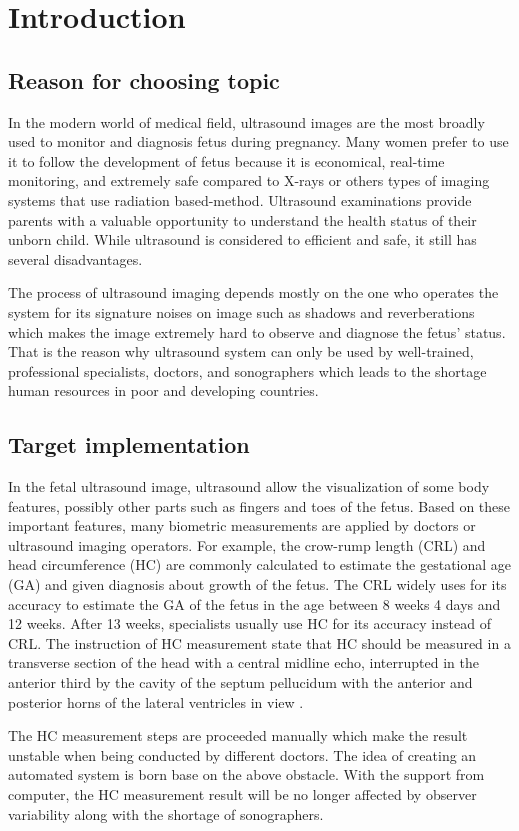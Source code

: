 \chapter{Introduction}
\section{Reason for choosing topic}
\label{section:reason_topic}
\noindent
	
	In the modern world of medical field, ultrasound images are the most broadly used to monitor and diagnosis fetus during pregnancy. Many women prefer to use it to follow the development of fetus because it is economical, real-time monitoring, and extremely safe compared to X-rays or others types of imaging systems that use radiation based-method. Ultrasound examinations provide parents with a valuable opportunity to understand the health status of their unborn child. While ultrasound is considered to efficient and safe, it still has several disadvantages. 
	
	The process of ultrasound imaging depends mostly on the one who operates the system for its signature noises on image such as shadows and reverberations which makes the image extremely hard to observe and diagnose the fetus’ status. That is the reason why ultrasound system can only be used by well-trained, professional specialists, doctors, and sonographers which leads to the shortage human resources in poor and developing countries.
	
\section{Target implementation}
\label{section:target_implementation}
\noindent
	
	In the fetal ultrasound image, ultrasound allow the visualization of some body features, possibly other parts such as fingers and toes of the fetus. Based on these important features, many biometric measurements are applied by doctors or ultrasound imaging operators. For example, the crow-rump length (CRL) and head circumference (HC) are commonly calculated to estimate the gestational age (GA) and given diagnosis about growth of the fetus. The CRL widely uses for its accuracy to estimate the GA of the fetus in the age between 8 weeks 4 days and 12 weeks. After 13 weeks, specialists usually use HC for its accuracy instead of CRL. The instruction of HC measurement state that HC should be measured in a transverse section of the head with a central midline echo, interrupted in the anterior third by the cavity of the septum pellucidum with the anterior and posterior horns of the lateral ventricles in view \cite{thomas}. 
	
	The HC measurement steps are proceeded manually which make the result unstable when being conducted by different doctors. The idea of creating an automated system is born base on the above obstacle. With the support from computer, the HC measurement result will be no longer affected by observer variability along with the shortage of sonographers.

    
    